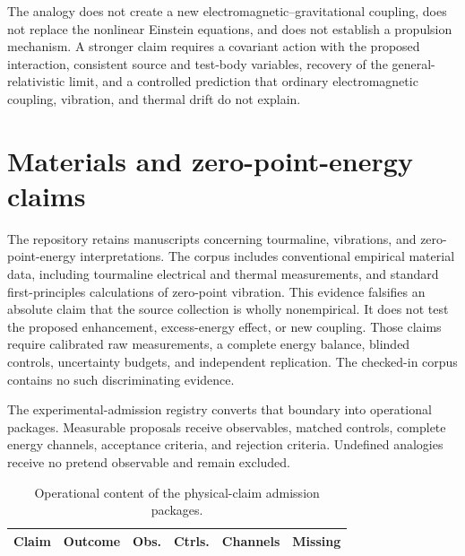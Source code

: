 The analogy does not create a new electromagnetic--gravitational coupling,
does not replace the nonlinear Einstein equations, and does not establish a
propulsion mechanism. A stronger claim requires a covariant action with the
proposed interaction, consistent source and test-body variables, recovery of
the general-relativistic limit, and a controlled prediction that ordinary
electromagnetic coupling, vibration, and thermal drift do not explain.

\section{Materials and zero-point-energy claims}

The repository retains manuscripts concerning tourmaline, vibrations, and
zero-point-energy interpretations. The corpus includes conventional empirical
material data, including tourmaline electrical and thermal measurements, and
standard first-principles calculations of zero-point vibration. This evidence
falsifies an absolute claim that the source collection is wholly nonempirical.
It does not test the proposed enhancement, excess-energy effect, or new
coupling. Those claims require calibrated raw measurements, a complete energy
balance, blinded controls, uncertainty budgets, and independent replication.
The checked-in corpus contains no such discriminating evidence.

The experimental-admission registry converts that boundary into operational
packages. Measurable proposals receive observables, matched controls, complete
energy channels, acceptance criteria, and rejection criteria. Undefined
analogies receive no pretend observable and remain excluded.

\begin{table}[htbp]
  \centering
  \caption{Operational content of the physical-claim admission packages.}
  \label{tab:experimental-admission-packages}
  \small
  \begin{tabularx}{\textwidth}{>{\raggedright\arraybackslash}p{}Yrrrr}
    \toprule
    Claim & Outcome & Obs. & Ctrls. & Channels & Missing \\
    \midrule
    
  \end{tabularx}
\end{table}
